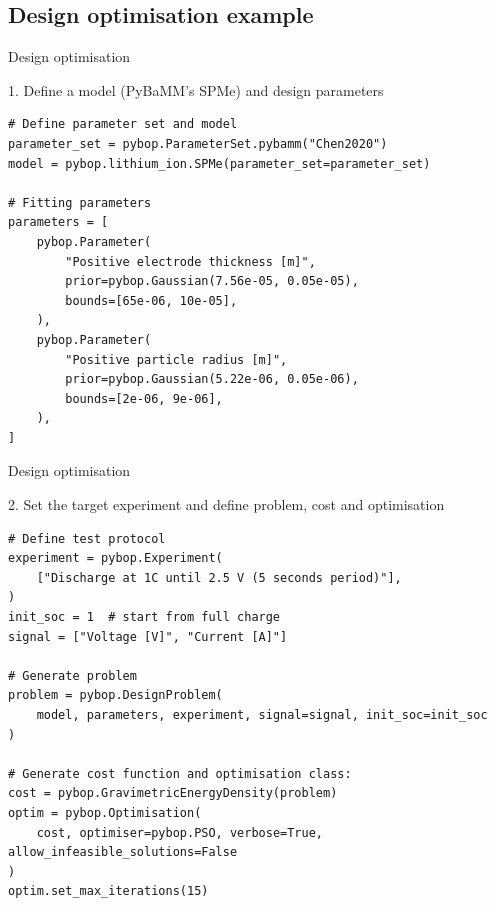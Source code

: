 \documentclass[aspectratio=169]{beamer} %
\begin{document}
\subsection{Design optimisation example}
\begin{frame}[fragile,t]{Design optimisation}
    \vspace{-1.5cm}
    \begin{block}{1. Define a model (PyBaMM's SPMe) and design parameters}
    \begin{lstlisting}[firstnumber=1, xleftmargin=10pt]
# Define parameter set and model
parameter_set = pybop.ParameterSet.pybamm("Chen2020")
model = pybop.lithium_ion.SPMe(parameter_set=parameter_set)

# Fitting parameters
parameters = [
    pybop.Parameter(
        "Positive electrode thickness [m]",
        prior=pybop.Gaussian(7.56e-05, 0.05e-05),
        bounds=[65e-06, 10e-05],
    ),
    pybop.Parameter(
        "Positive particle radius [m]",
        prior=pybop.Gaussian(5.22e-06, 0.05e-06),
        bounds=[2e-06, 9e-06],
    ),
]
    \end{lstlisting}
    \end{block}
\end{frame}

\begin{frame}[fragile,t]{Design optimisation}
    \vspace{-1cm}
    \begin{block}{2. Set the target experiment and define problem, cost and optimisation}
    \begin{lstlisting}[firstnumber=1, xleftmargin=10pt]
# Define test protocol
experiment = pybop.Experiment(
    ["Discharge at 1C until 2.5 V (5 seconds period)"],
)
init_soc = 1  # start from full charge
signal = ["Voltage [V]", "Current [A]"]

# Generate problem
problem = pybop.DesignProblem(
    model, parameters, experiment, signal=signal, init_soc=init_soc
)

# Generate cost function and optimisation class:
cost = pybop.GravimetricEnergyDensity(problem)
optim = pybop.Optimisation(
    cost, optimiser=pybop.PSO, verbose=True, allow_infeasible_solutions=False
)
optim.set_max_iterations(15)
    \end{lstlisting}
    \end{block}
\end{frame}
\end{document}
